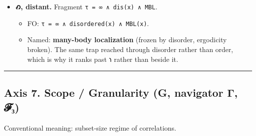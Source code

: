 \documentclass[12pt,a4paper]{article}
\begin{document}
\begin{itemize}
  \begin{itemize}
  \tightlist
  \item
    FO: \texttt{τ\ =\ ∞\ ∧\ ordered(x)}.
  \item
    Named: \textbf{frozen by order} (kinetically trapped, non-ergodic).
    The store is infinite and inaccessible: held forever, ordered, with
    no open gate. Maximum τ, unusable.
  \end{itemize}
\item
  \textbf{𐑺, distant.} Fragment \texttt{τ\ =\ ∞\ ∧\ dis(x)\ ∧\ MBL}.

  \begin{itemize}
  \tightlist
  \item
    FO: \texttt{τ\ =\ ∞\ ∧\ disordered(x)\ ∧\ MBL(x)}.
  \item
    Named: \textbf{many-body localization} (frozen by disorder,
    ergodicity broken). The same trap reached through disorder rather
    than order, which is why it ranks past 𐑪 rather than beside it.
  \end{itemize}
\end{itemize}

\begin{center}\rule{0.5\linewidth}{0.5pt}\end{center}

\hypertarget{axis-7.-scope-granularity-g-navigator-ux3b3-ux1d4d5ux2083}{%
\subsection{Axis 7. Scope / Granularity (G, navigator Γ,
𝓕₃)}\label{axis-7.-scope-granularity-g-navigator-ux3b3-ux1d4d5ux2083}}

Conventional meaning: subset-size regime of correlations.
\end{document}
